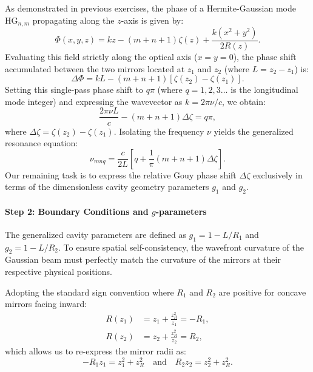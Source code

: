\begin{resolucao}[Solution]
            As demonstrated in previous exercises, the phase of a Hermite-Gaussian mode $\text{HG}_{n,m}$ propagating along the $z$-axis is given by:
            \begin{equation}
                \Phi(x, y, z) = kz - (m+n+1)\zeta(z) + \frac{k(x^2+y^2)}{2R(z)}.
                \label{eq:total_phase}
            \end{equation}
            Evaluating this field strictly along the optical axis ($x=y=0$), the phase shift accumulated between the two mirrors located at $z_1$ and $z_2$ (where $L = z_2 - z_1$) is:
            \begin{equation}
                \Delta \Phi = kL - (m+n+1)\left[\zeta(z_2) - \zeta(z_1)\right].
            \end{equation}
            Setting this single-pass phase shift to $q\pi$ (where $q = 1, 2, 3 \dots$ is the longitudinal mode integer) and expressing the wavevector as $k = 2\pi\nu/c$, we obtain:
            \begin{equation}
                \frac{2\pi\nu L}{c} - (m+n+1)\Delta\zeta = q\pi,
                \label{eq:phase_resonance}
            \end{equation}
            where $\Delta\zeta = \zeta(z_2) - \zeta(z_1)$. Isolating the frequency $\nu$ yields the generalized resonance equation:
            \begin{equation}
                \nu_{mnq} = \frac{c}{2L} \left[ q + \frac{1}{\pi}(m+n+1)\Delta\zeta \right].
                \label{eq:nu_general}
            \end{equation}
            Our remaining task is to express the relative Gouy phase shift $\Delta\zeta$ exclusively in terms of the dimensionless cavity geometry parameters $g_1$ and $g_2$.
    
        \paragraph*{Step 2: Boundary Conditions and $g$-parameters}
            The generalized cavity parameters are defined as $g_1 = 1 - L/R_1$ and $g_2 = 1 - L/R_2$. To ensure spatial self-consistency, the wavefront curvature of the Gaussian beam must perfectly match the curvature of the mirrors at their respective physical positions.
            
            Adopting the standard sign convention where $R_1$ and $R_2$ are positive for concave mirrors facing inward:
            \begin{align}
                R(z_1) &= z_1 + \frac{z_R^2}{z_1} = -R_1, \\
                R(z_2) &= z_2 + \frac{z_R^2}{z_2} = R_2,
            \end{align}
            which allows us to re-express the mirror radii as:
            \begin{equation}
                -R_1 z_1 = z_1^2 + z_R^2 \quad \text{and} \quad R_2 z_2 = z_2^2 + z_R^2.
                \label{eq:radii_conditions}
            \end{equation}
    

\end{resolucao}

